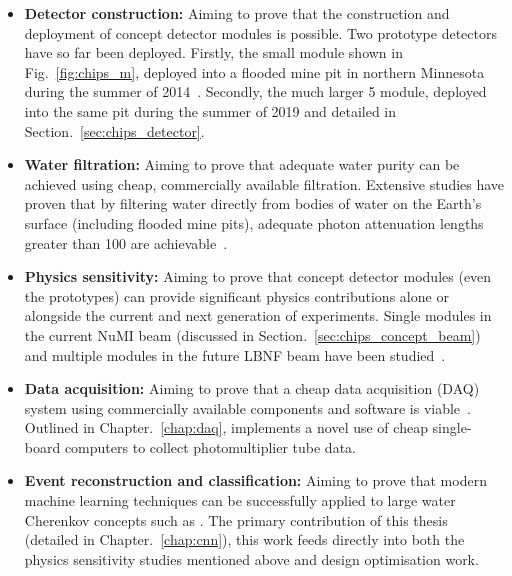 \begin{itemize}
    \item \textbf{Detector construction:} Aiming to prove that the construction and deployment of
          \chips concept detector modules is possible. Two prototype detectors have so far been
          deployed. Firstly, the small \chipsm module shown in Fig.~\ref{fig:chips_m}, deployed
          into a flooded mine pit in northern Minnesota during the summer of 2014~\cite{perch2015,
              pfutznerProto2017, pfutzner2017}. Secondly, the much larger \unit{5}{}
          \chipsfive module, deployed into the same pit during the summer of 2019 and detailed in
          Section.~\ref{sec:chips_detector}.

    \item \textbf{Water filtration:} Aiming to prove that adequate water purity can be achieved
          using cheap, commercially available filtration. Extensive studies have proven that by
          filtering water directly from bodies of water on the Earth's surface (including flooded
          mine pits), adequate photon attenuation lengths greater than \unit{100}{} are
          achievable~\cite{amat2017, campbell2020}.

    \item \textbf{Physics sensitivity:} Aiming to prove that \chips concept detector modules (even
          the prototypes) can provide significant physics contributions alone or alongside the
          current and next generation of experiments. Single modules in the current NuMI beam
          (discussed in Section.~\ref{sec:chips_concept_beam}) and multiple modules in the future
          LBNF beam have been studied~\cite{pfutzner2017, adde2016, lang2015}.

    \item \textbf{Data acquisition:} Aiming to prove that a cheap data acquisition (DAQ) system
          using commercially available components and software is viable~\cite{eijk2018}. Outlined
          in Chapter.~\ref{chap:daq}, \chips implements a novel use of cheap single-board
          computers to collect photomultiplier tube data.

    \item \textbf{Event reconstruction and classification:} Aiming to prove that modern machine
          learning techniques can be successfully applied to large water Cherenkov concepts such
          as \chips. The primary contribution of this thesis (detailed in
          Chapter.~\ref{chap:cnn}), this work feeds directly into both the physics sensitivity
          studies mentioned above and design optimisation work.
\end{itemize}

